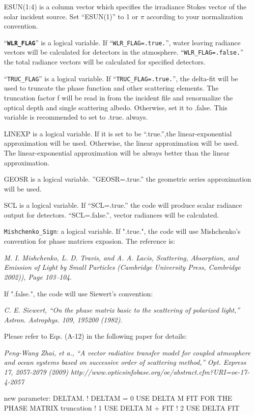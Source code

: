 \documentclass[10pt,letterpaper]{article}
\begin{document}
ESUN(1:4) is a column vector which specifies the irradiance Stokes vector of the solar incident source.  Set ``ESUN(1)'' to 1 or $\pi$ according to your normalization convention.

``{\bf \verb+WLR_FLAG+}'' is a logical variable.  If ``\verb+WLR_FLAG=.true.+'', water leaving radiance vectors will be calculated for detectors in the atmosphere.
``\verb+WLR_FLAG=.false.+'' the total radiance vectors will be calculated for specified detectors.

``\verb+TRUC_FLAG+'' is a logical variable. If  ``\verb+TRUC_FLAG=.true.+'', the delta-fit will be used to truncate the phase function and other scattering elements.  The truncation factor f will be read in from the incident file and renormalize the optical depth and single scattering albedo.  Otherwise, set it to .false.  This variable is recommended to set to .true. always.

LINEXP is a logical variable.  If it is set to be ``.true.'',the linear-exponential approximation will be used.  Otherwise, the linear approximation will be used.  The linear-exponential approximation will be always better than the linear approximation.

GEOSR is a logical variable.  ''GEOSR=.true.''  the geometric series approximation  will be used.

SCL is a logical variable.  If ``SCL=.true.'' the code will produce scalar radiance output for detectors. ``SCL=.false.'', vector radiances will be calculated.

\verb+Mishchenko_Sign+: a logical variable.  If ".true.", the code will use Mishchenko's convention for phase matrices expasion.  The reference is:


{\it M. I. Mishchenko, L. D. Travis, and A. A. Lacis, Scattering, Absorption, and Emission of Light by Small Particles
(Cambridge University Press, Cambridge 2002)), Page 103--104}.


If ".false.", the code will use Siewert's convention:

{\it C. E. Siewert, ``On the phase matrix basic to the scattering of polarized light,'' Astron. Astrophys. 109, 195200 (1982)}.

Please refer to Eqs. (A-12) in the following paper for details:

{\it Peng-Wang Zhai, et a., ``A vector radiative transfer model for coupled atmosphere and ocean systems based on successive order of scattering method,'' Opt. Express 17, 2057-2079 (2009) 
http://www.opticsinfobase.org/oe/abstract.cfm?URI=oe-17-4-2057}

new parameter: DELTAM. 
! DELTAM = 0 USE DELTA M FIT FOR THE PHASE MATRIX truncation
!          1 USE DELTA M + FIT
!          2 USE DELTA FIT
\end{document}
